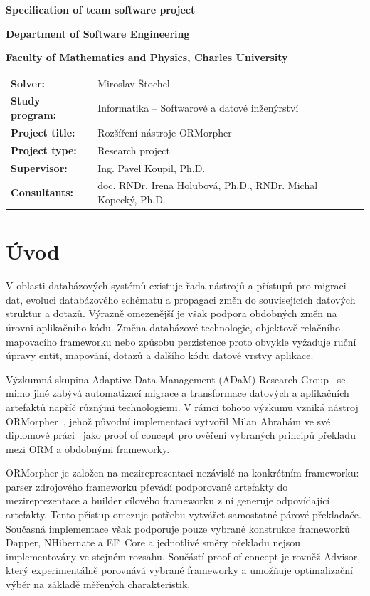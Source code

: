 \documentclass{article}
\title{\ProjectTitle}
\author{\StudentsFullName}
\def\ResearchProject{Research project}
\def\StudentsFullName{Miroslav Štochel}
\def\StudyProgram{Informatika -- Softwarové a datové inženýrství}
\def\ProjectTitle{Rozšíření nástroje ORMorpher}
\def\ProjectType{\ResearchProject}
\def\SupervisorFullName{Ing. Pavel Koupil, Ph.D.}
\def\ConsultantsFullName{doc. RNDr. Irena Holubová, Ph.D., RNDr. Michal Kopecký, Ph.D.}
\begin{document}
\shorthandoff{-}

\centerline{\Large \textbf{Specification of team software project}}
\centerline{ \textbf{Department of Software Engineering}}
\centerline{ \textbf{Faculty of Mathematics and Physics, Charles University}}
\bigskip
{\noindent\begin{tabular*}{\textwidth}{ >{\raggedleft}m{4cm} l}
 \textbf{Solver:} & \StudentsFullName \\
 \textbf{Study program:} & \StudyProgram \\[1em]
 \textbf{Project title:} & \ProjectTitle \\
 \textbf{Project type:} & \ProjectType \\[1em]
 \textbf{Supervisor:} & \SupervisorFullName \\
 \textbf{Consultants:} & \ConsultantsFullName \\
\end{tabular*}}

\section{Úvod}

V oblasti databázových systémů existuje řada nástrojů a přístupů pro migraci dat, evoluci databázového schématu a propagaci změn do souvisejících datových struktur a dotazů. Výrazně omezenější je však podpora obdobných změn na úrovni aplikačního kódu. Změna databázové technologie, objektově-relačního mapovacího frameworku nebo způsobu perzistence proto obvykle vyžaduje ruční úpravy entit, mapování, dotazů a dalšího kódu datové vrstvy aplikace.

Výzkumná skupina Adaptive Data Management (ADaM) Research Group~\cite{adam-web} se mimo jiné zabývá automatizací migrace a transformace datových a aplikačních artefaktů napříč různými technologiemi. V rámci tohoto výzkumu vzniká nástroj ORMorpher~\cite{ormorpher-web}, jehož původní implementaci vytvořil Milan Abrahám ve své diplomové práci~\cite{abraham-repo} jako proof of concept pro ověření vybraných principů překladu mezi ORM a obdobnými frameworky.

ORMorpher je založen na mezireprezentaci nezávislé na konkrétním frameworku: parser zdrojového frameworku převádí podporované artefakty do mezireprezentace a builder cílového frameworku z ní generuje odpovídající artefakty. Tento přístup omezuje potřebu vytvářet samostatné párové překladače. Současná implementace však podporuje pouze vybrané konstrukce frameworků Dapper, NHibernate a EF~Core a jednotlivé směry překladu nejsou implementovány ve stejném rozsahu. Součástí proof of concept je rovněž Advisor, který experimentálně porovnává vybrané frameworky a umožňuje optimalizační výběr na základě měřených charakteristik.
\end{document}
